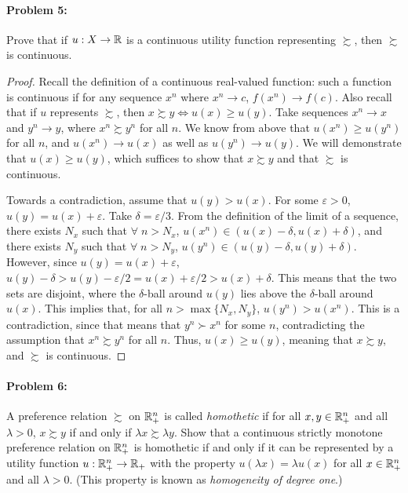 \documentclass[12pt]{article}
\begin{document}
\paragraph{Problem 5:} Prove that if $u : X \to \mathbb{R}$ is a continuous utility function representing $\succsim$, then $\succsim$ is continuous.

\medskip

\begin{proof}
    Recall the definition of a continuous real-valued function: such a function is continuous if for any sequence $x^n$ where $x^n \to c$, $f(x^n) \to f(c)$. Also recall that if $u$ represents $\succsim$, then $x \succsim y \Longleftrightarrow u(x) \ge u(y)$. Take sequences $x^n \to x$ and $y^n \to y$, where $x^n \succsim y^n$ for all $n$. We know from above that $u(x^n) \ge u(y^n)$ for all $n$, and $u(x^n) \to u(x)$ as well as $u(y^n) \to u(y)$. We will demonstrate that $u(x) \ge u(y)$, which suffices to show that $x \succsim y$ and that $\succsim$ is continuous.

    Towards a contradiction, assume that $u(y) > u(x)$. For some $\varepsilon > 0$, $u(y) = u(x) + \varepsilon$. Take $\delta = \varepsilon / 3$. From the definition of the limit of a sequence, there exists $N_x$ such that $\forall \; n > N_x$, $u(x^n) \in (u(x) - \delta,u(x) + \delta)$, and there exists $N_y$ such that $\forall \; n > N_y$, $u(y^n) \in (u(y) - \delta,u(y) + \delta)$. However, since $u(y) = u(x) + \varepsilon$, $u(y) - \delta > u(y) - \varepsilon / 2 = u(x) + \varepsilon / 2 > u(x) + \delta$. This means that the two sets are disjoint, where the $\delta$-ball around $u(y)$ lies above the $\delta$-ball around $u(x)$. This implies that, for all $n > \max\{N_x,N_y\}$, $u(y^n) > u(x^n)$. This is a contradiction, since that means that $y^n \succ x^n$ for some $n$, contradicting the assumption that $x^n \succsim y^n$ for all $n$. Thus, $u(x) \ge u(y)$, meaning that $x \succsim y$, and $\succsim$ is continuous.
\end{proof}

\paragraph{Problem 6:} A preference relation $\succsim$ on $\mathbb{R}^n_+$ is called \emph{homothetic} if for all $x,y \in \mathbb{R}^n_+$ and all $\lambda > 0$, $x \succsim y$ if and only if $\lambda x \succsim \lambda y$. Show that a continuous strictly monotone preference relation on $\mathbb{R}^n_+$ is homothetic if and only if it can be represented by a utility function $u : \mathbb{R}^n_+ \to \mathbb{R}_+$ with the property $u(\lambda x) = \lambda u(x)$ for all $x \in \mathbb{R}^n_+$ and all $\lambda > 0$. (This property is known as \emph{homogeneity of degree one}.)
\end{document}
